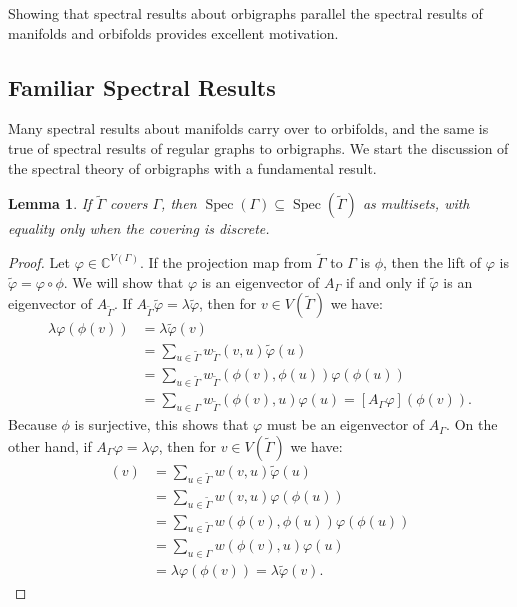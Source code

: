 \documentclass[12pt]{article}
\theoremstyle{plain}
\newtheorem{lemma}[theorem]{Lemma}
\theoremstyle{definition}
\theoremstyle{remark}
\DeclareMathOperator*{\spec}{Spec}
\providecommand{\cover}[1]{\widetilde{#1}}
\begin{document}
  Showing that spectral results about orbigraphs parallel the spectral results of manifolds and orbifolds provides excellent motivation.


  \subsection{Familiar Spectral Results}

    Many spectral results about manifolds carry over to orbifolds, and the same is true of spectral results of regular graphs to orbigraphs. We start the discussion of the spectral theory of orbigraphs with a fundamental result.

    \begin{lemma}\label{lemma:SpectrumInclusion}
      If $\widetilde{\Gamma}$ covers $\Gamma$, then $\spec(\Gamma) \subseteq \spec(\widetilde{\Gamma})$ as multisets, with equality only when the covering is discrete.
    \end{lemma}
    \begin{proof}
      Let $\varphi \in \mathbb{C}^{V(\Gamma)}$. If the projection map from $\cover{\Gamma}$ to $\Gamma$ is $\phi$, then the lift of $\varphi$ is $\cover{\varphi} = \varphi \circ \phi$. We will show that $\varphi$ is an eigenvector of $A_\Gamma$ if and only if $\cover{\varphi}$ is an eigenvector of $A_{\cover{\Gamma}}$. If $A_{\cover{\Gamma}} \cover{\varphi} = \lambda \cover{\varphi}$, then for $v \in V(\cover{\Gamma})$ we have:
      \begin{align*}
        \lambda \varphi(\phi(v)) &= \lambda \cover{\varphi}(v) \\
        &= \sum_{u \in \cover{\Gamma}} w_{\cover{\Gamma}}(v, u)\cover{\varphi}(u) \\
        &= \sum_{u \in \cover{\Gamma}} w_{\cover{\Gamma}}(\phi(v), \phi(u)) \varphi(\phi(u)) \\
        &= \sum_{u \in \Gamma} w_{\cover{\Gamma}}(\phi(v), u) \varphi(u) = [A_\Gamma \varphi](\phi(v)).
      \end{align*}
      Because $\phi$ is surjective, this shows that $\varphi$ must be an eigenvector of $A_\Gamma$. On the other hand, if $A_\Gamma \varphi = \lambda \varphi$, then for $v \in V(\cover{\Gamma})$ we have:
      \begin{align*}
        [A_{\cover{\Gamma}} \cover{\varphi}](v) &= \sum_{u \in \cover{\Gamma}} w(v, u) \cover{\varphi}(u) \\
        &= \sum_{u \in \cover{\Gamma}} w(v, u) \varphi(\phi(u)) \\
        &= \sum_{u \in \cover{\Gamma}} w(\phi(v), \phi(u)) \varphi(\phi(u)) \\
        &= \sum_{u \in \Gamma} w(\phi(v), u) \varphi(u) \\
        &= \lambda \varphi(\phi(v)) = \lambda \cover{\varphi}(v).
      \end{align*}
    \end{proof}
\end{document}
